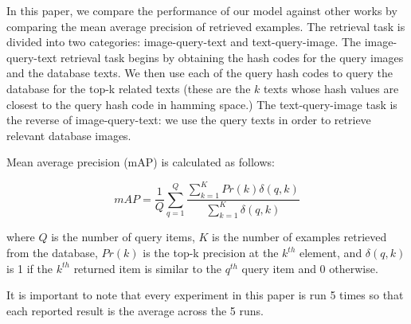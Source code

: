 \documentclass[letterpaper]{article}
\begin{document}
In this paper, we compare the performance of our model against other works by comparing the mean average precision of retrieved examples. The retrieval task is divided into two categories: image-query-text and text-query-image. The image-query-text retrieval task begins by obtaining the hash codes for the query images and the database texts. We then use each of the query hash codes to query the database for the top-k related texts (these are the $ k $ texts whose hash values are closest to the query hash code in hamming space.) The text-query-image task is the reverse of image-query-text: we use the query texts in order to retrieve relevant database images.

Mean average precision (mAP) is calculated as follows:

\begin{equation}
\label{eq:map}
mAP = \frac{1}{Q} \sum_{q=1}^Q \frac{\sum_{k=1}^K Pr(k)\delta(q,k)}{\sum_{k=1}^K\delta(q,k)} 
\end{equation}

where $ Q $ is the number of query items, $ K $ is the number of examples retrieved from the database, $ Pr(k) $ is the top-k precision at the $ k^{th} $ element, and $ \delta(q,k) $ is 1 if the $ k^{th} $ returned item is similar to the $ q^{th} $ query item and 0 otherwise.

It is important to note that every experiment in this paper is run 5 times so that each reported result is the average across the 5 runs.
\end{document}
